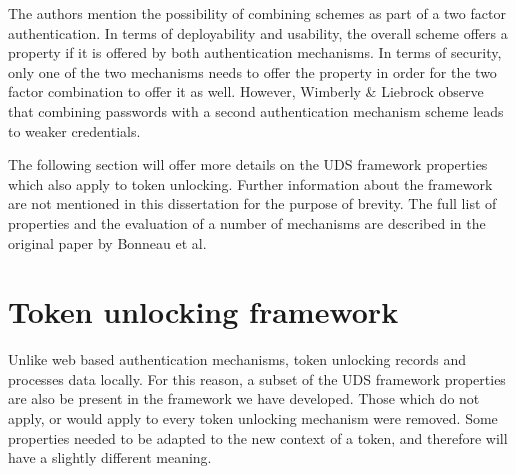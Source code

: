 The authors mention the possibility of combining schemes as part of a two factor authentication. In terms of deployability and usability, the overall scheme offers a property if it is offered by both authentication mechanisms. In terms of security, only one of the two mechanisms needs to offer the property in order for the two factor combination to offer it as well. However, Wimberly \& Liebrock \cite{wimberly2011using} observe that combining passwords with a second authentication mechanism scheme leads to weaker credentials.

The following section will offer more details on the UDS framework properties which also apply to token unlocking. Further information about the framework are not mentioned in this dissertation for the purpose of brevity.  The full list of properties and the evaluation of a number of mechanisms are described in the original paper by Bonneau et al. 

\section{Token unlocking framework}
Unlike web based authentication mechanisms, token unlocking records and processes data locally. For this reason, a subset of the UDS framework properties are also be present in the framework we have developed. Those which do not apply, or would apply to every token unlocking mechanism were removed. Some properties needed to be adapted to the new context of a token, and therefore will have a slightly different meaning.

